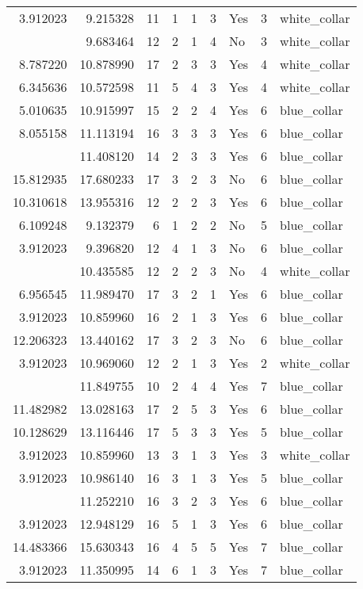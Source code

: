 \documentclass[
]{article}
\begin{document}
\begin{longtable}[t]{rrrrrllrl}
3.912023 & 9.215328 & 11 & 1 & 1 & 3 & Yes & 3 & white\_collar\\
\addlinespace
3.912023 & 9.683464 & 12 & 2 & 1 & 4 & No & 3 & white\_collar\\
8.787220 & 10.878990 & 17 & 2 & 3 & 3 & Yes & 4 & white\_collar\\
6.345636 & 10.572598 & 11 & 5 & 4 & 3 & Yes & 4 & white\_collar\\
5.010635 & 10.915997 & 15 & 2 & 2 & 4 & Yes & 6 & blue\_collar\\
8.055158 & 11.113194 & 16 & 3 & 3 & 3 & Yes & 6 & blue\_collar\\
\addlinespace
8.527143 & 11.408120 & 14 & 2 & 3 & 3 & Yes & 6 & blue\_collar\\
15.812935 & 17.680233 & 17 & 3 & 2 & 3 & No & 6 & blue\_collar\\
10.310618 & 13.955316 & 12 & 2 & 2 & 3 & Yes & 6 & blue\_collar\\
6.109248 & 9.132379 & 6 & 1 & 2 & 2 & No & 5 & blue\_collar\\
3.912023 & 9.396820 & 12 & 4 & 1 & 3 & No & 6 & blue\_collar\\
\addlinespace
4.094345 & 10.435585 & 12 & 2 & 2 & 3 & No & 4 & white\_collar\\
6.956545 & 11.989470 & 17 & 3 & 2 & 1 & Yes & 6 & blue\_collar\\
3.912023 & 10.859960 & 16 & 2 & 1 & 3 & Yes & 6 & blue\_collar\\
12.206323 & 13.440162 & 17 & 3 & 2 & 3 & No & 6 & blue\_collar\\
3.912023 & 10.969060 & 12 & 2 & 1 & 3 & Yes & 2 & white\_collar\\
\addlinespace
5.857933 & 11.849755 & 10 & 2 & 4 & 4 & Yes & 7 & blue\_collar\\
11.482982 & 13.028163 & 17 & 2 & 5 & 3 & Yes & 6 & blue\_collar\\
10.128629 & 13.116446 & 17 & 5 & 3 & 3 & Yes & 5 & blue\_collar\\
3.912023 & 10.859960 & 13 & 3 & 1 & 3 & Yes & 3 & white\_collar\\
3.912023 & 10.986140 & 16 & 3 & 1 & 3 & Yes & 5 & blue\_collar\\
\addlinespace
6.363028 & 11.252210 & 16 & 3 & 2 & 3 & Yes & 6 & blue\_collar\\
3.912023 & 12.948129 & 16 & 5 & 1 & 3 & Yes & 6 & blue\_collar\\
14.483366 & 15.630343 & 16 & 4 & 5 & 5 & Yes & 7 & blue\_collar\\
3.912023 & 11.350995 & 14 & 6 & 1 & 3 & Yes & 7 & blue\_collar\\

\end{longtable}
\end{document}

